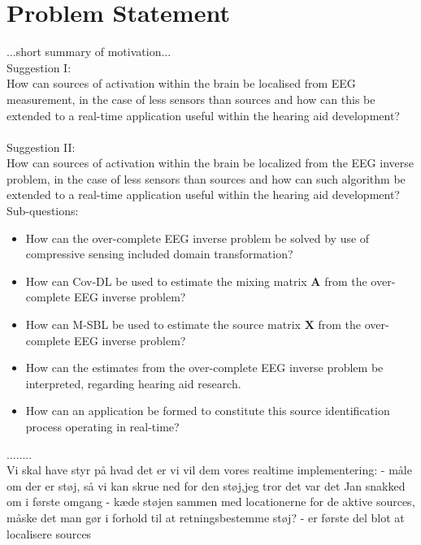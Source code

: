 \chapter{Problem Statement}
...short summary of motivation...\\ 

Suggestion I:\\
How can sources of activation within the brain be localised from EEG measurement, in the case of less sensors than sources and how can this be extended to a real-time application useful within the hearing aid development?\\
\\
Suggestion II: \\
How can sources of activation within the brain be localized from the EEG inverse problem, in the case of less sensors than sources and how can such algorithm be extended to a real-time application useful within the hearing aid development?
\\

Sub-questions:\\
\begin{itemize}
\item How can the over-complete EEG inverse problem be solved by use of compressive sensing included domain transformation?
\item How can Cov-DL be used to estimate the mixing matrix $\mathbf{A}$ from the over-complete EEG inverse problem?
\item How can M-SBL be used to estimate the source matrix $\mathbf{X}$ from the over-complete EEG inverse problem?
\item How can the estimates from the over-complete EEG inverse problem be interpreted, regarding hearing aid research. 
\item How can an application be formed to constitute this source identification process operating in real-time?
\end{itemize}


........\\
Vi skal have styr på hvad det er vi vil dem vores realtime implementering: 
- måle om der er støj, så vi kan skrue ned for den støj,jeg tror det var det Jan snakked om i første omgang 
- kæde støjen sammen med locationerne for de aktive sources, måske det man gør i forhold til at retningsbestemme støj? 
- er første del blot at localisere sources  

 